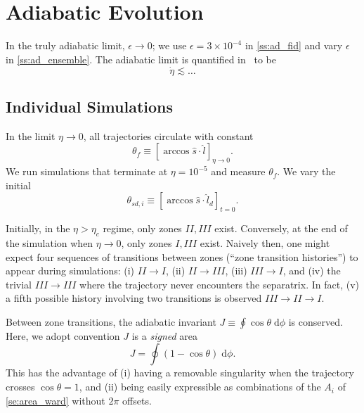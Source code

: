 \documentclass[
        fleqn,
        usenatbib,
    ]{mnras}
\newcommand*{\p}[1]{\left(#1\right)}
\newcommand*{\s}[1]{\left[#1\right]}
\begin{document}
\section{Adiabatic Evolution}\label{s:ad}

In the truly adiabatic limit, $\epsilon \to 0$; we use $\epsilon =
3 \times 10^{-4}$ in \autoref{ss:ad_fid} and vary $\epsilon$ in
\autoref{ss:ad_ensemble}. The adiabatic limit is quantified
in~\cite{millholland_disk} to be
\begin{equation}
    \dot{\eta} \lesssim \dots \label{eq:ad_constr}
\end{equation}

\subsection{Individual Simulations}\label{ss:ad_fid}

In the limit $\eta \to 0$, all trajectories circulate with constant
\begin{equation}
    \theta_{f} \equiv \s{\arccos \hat{s} \cdot \hat{l}}_{\eta \to 0}.
\end{equation}
We run simulations that terminate at $\eta = 10^{-5}$ and measure
$\theta_{f}$. We vary the initial
\begin{equation}
    \theta_{sd, i} \equiv \s{\arccos \hat{s} \cdot \hat{l}_d}_{t=0}.
\end{equation}

Initially, in the $\eta > \eta_c$ regime, only zones $II, III$ exist.
Conversely, at the end of the simulation when $\eta \to 0$, only zones $I, III$
exist. Naively then, one might expect four sequences of transitions
between zones (``zone transition histories'') to appear during simulations: (i)
$II \to I$, (ii) $II \to III$, (iii) $III \to I$, and (iv) the trivial $III \to
III$ where the trajectory never encounters the separatrix. In fact, (v) a fifth
possible history involving two transitions is observed $III \to II \to I$.

Between zone transitions, the adiabatic invariant $J \equiv \oint \cos\theta
\;\mathrm{d}\phi$ is conserved. Here, we adopt convention $J$ is a \emph{signed}
area
\begin{equation}
    J = \oint \p{1 - \cos \theta}\;\mathrm{d}\phi.
\end{equation}
This has the advantage of (i) having a removable singularity when the trajectory
crosses $\cos \theta = 1$, and (ii) being easily expressible as combinations of
the $A_i$ of \autoref{se:area_ward} without $2\pi$ offsets.
\end{document}

